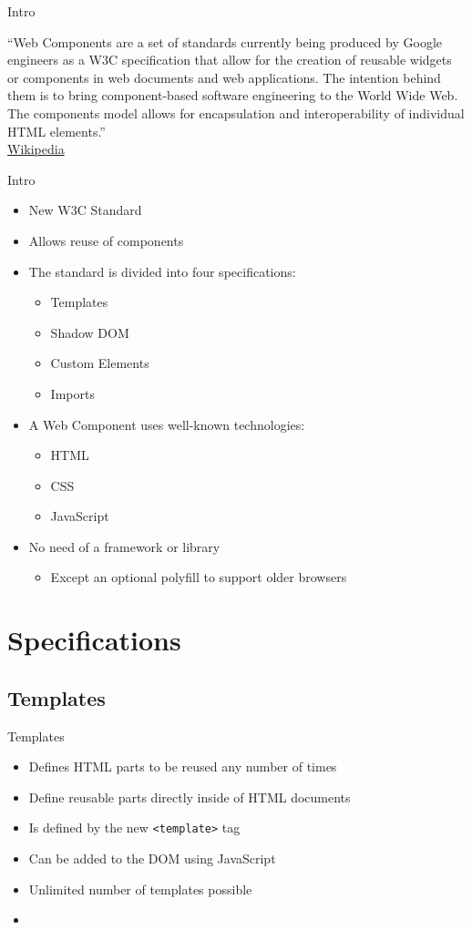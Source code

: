 \documentclass{beamer}
\newcommand{\code}[1]{\texttt{#1}}
\newcommand{\listing}[1]{
	\begin{itemize}
		\item[]
	\end{itemize}
}
\newcommand{\slideItems}[1]{
	\begin{itemize}
		#1
	\end{itemize}
}
\newcommand{\slide}[2]{
	\begin{frame}{#1}
		#2
	\end{frame}
}
\begin{document}
\slide{Intro}{
	``Web Components are a set of standards currently being produced by Google engineers as a W3C specification that allow for the creation of reusable widgets or components in web documents and web applications. The intention behind them is to bring component-based software engineering to the World Wide Web. The components model allows for encapsulation and interoperability of individual HTML elements.'' \\
	\hfill\tiny{\href{https://en.wikipedia.org/wiki/Web_Components}{Wikipedia}}
}

\slide{Intro}{
	\slideItems{
		\item New W3C Standard
		\item Allows reuse of components
		\item The standard is divided into four specifications:
			\slideItems{
				\item Templates
				\item Shadow DOM
				\item Custom Elements
				\item Imports
			}
		\item A Web Component uses well-known technologies:
			\slideItems{
				\item HTML
				\item CSS
				\item JavaScript
			}
		\item No need of a framework or library
			\slideItems{
				\item Except an optional polyfill to support older browsers
			}
	}
}

\section{Specifications}

\subsection{Templates}

\slide{Templates}{
	\slideItems{
		\item Defines HTML parts to be reused any number of times
		\item Define reusable parts directly inside of HTML documents
		\item Is defined by the new \code{<template>} tag
		\item Can be added to the DOM using JavaScript
		\item Unlimited number of templates possible
	}
	\listing{template.html}
}
\end{document}

